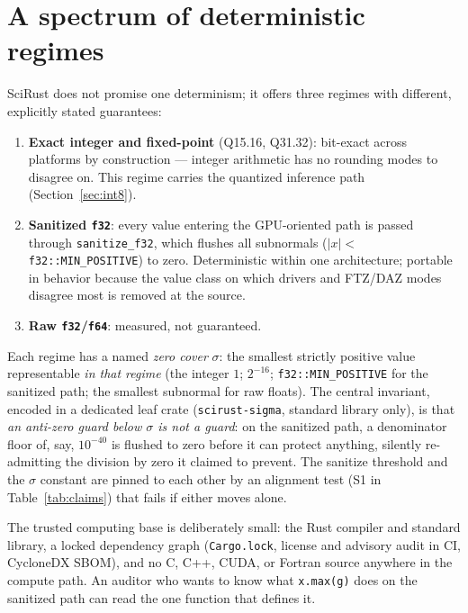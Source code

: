 \documentclass[sigconf,review]{acmart}
\begin{document}
\section{A spectrum of deterministic regimes}
\label{sec:regimes}

SciRust does not promise one determinism; it offers three regimes with
different, explicitly stated guarantees:

\begin{enumerate}
  \item \textbf{Exact integer and fixed-point} (Q15.16, Q31.32): bit-exact
    across platforms by construction --- integer arithmetic has no rounding
    modes to disagree on. This regime carries the quantized inference path
    (Section~\ref{sec:int8}).
  \item \textbf{Sanitized \texttt{f32}}: every value entering the
    GPU-oriented path is passed through \texttt{sanitize\_f32}, which
    flushes all subnormals ($|x| <$ \texttt{f32::MIN\_POSITIVE}) to zero.
    Deterministic within one architecture; portable in behavior because the
    value class on which drivers and FTZ/DAZ modes disagree most
    \cite{monniaux2008,zahid2024gpu} is removed at the source.
  \item \textbf{Raw \texttt{f32}/\texttt{f64}}: measured, not guaranteed.
\end{enumerate}

Each regime has a named \emph{zero cover} $\sigma$: the smallest strictly
positive value representable \emph{in that regime} (the integer $1$;
$2^{-16}$; \texttt{f32::MIN\_POSITIVE} for the sanitized path; the smallest
subnormal for raw floats). The central invariant, encoded in a dedicated
leaf crate (\texttt{scirust-sigma}, standard library only), is that
\emph{an anti-zero guard below $\sigma$ is not a guard}: on the sanitized
path, a denominator floor of, say, $10^{-40}$ is flushed to zero before it
can protect anything, silently re-admitting the division by zero it claimed
to prevent. The sanitize threshold and the $\sigma$ constant are pinned to
each other by an alignment test (S1 in Table~\ref{tab:claims}) that fails
if either moves alone.

The trusted computing base is deliberately small: the Rust compiler and
standard library, a locked dependency graph (\texttt{Cargo.lock}, license
and advisory audit in CI, CycloneDX SBOM), and no C, C++, CUDA, or Fortran
source anywhere in the compute path. An auditor who wants to know what
\texttt{x.max(g)} does on the sanitized path can read the one function that
defines it.
\end{document}
